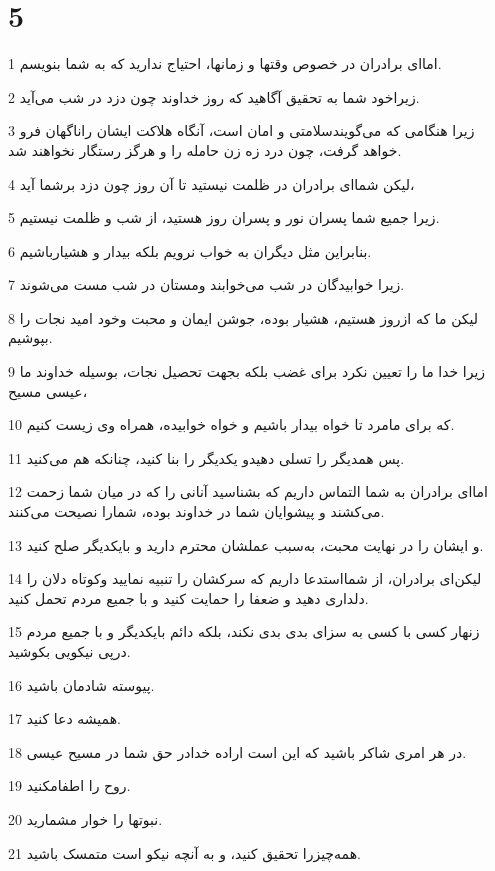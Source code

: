 \chapter{5}

\par 1 اما‌ای برادران در خصوص وقتها و زمانها، احتیاج ندارید که به شما بنویسم.
\par 2 زیراخود شما به تحقیق آگاهید که روز خداوند چون دزد در شب می‌آید.
\par 3 زیرا هنگامی که می‌گویندسلامتی و امان است، آنگاه هلاکت ایشان راناگهان فرو خواهد گرفت، چون درد زه زن حامله را و هرگز رستگار نخواهند شد.
\par 4 لیکن شما‌ای برادران در ظلمت نیستید تا آن روز چون دزد برشما آید،
\par 5 زیرا جمیع شما پسران نور و پسران روز هستید، از شب و ظلمت نیستیم.
\par 6 بنابراین مثل دیگران به خواب نرویم بلکه بیدار و هشیارباشیم.
\par 7 زیرا خوابیدگان در شب می‌خوابند ومستان در شب مست می‌شوند.
\par 8 لیکن ما که ازروز هستیم، هشیار بوده، جوشن ایمان و محبت وخود امید نجات را بپوشیم.
\par 9 زیرا خدا ما را تعیین نکرد برای غضب بلکه بجهت تحصیل نجات، بوسیله خداوند ما عیسی مسیح،
\par 10 که برای مامرد تا خواه بیدار باشیم و خواه خوابیده، همراه وی زیست کنیم.
\par 11 پس همدیگر را تسلی دهیدو یکدیگر را بنا کنید، چنانکه هم می‌کنید.
\par 12 اما‌ای برادران به شما التماس داریم که بشناسید آنانی را که در میان شما زحمت می‌کشند و پیشوایان شما در خداوند بوده، شمارا نصیحت می‌کنند.
\par 13 و ایشان را در نهایت محبت، به‌سبب عملشان محترم دارید و بایکدیگر صلح کنید.
\par 14 لیکن‌ای برادران، از شمااستدعا داریم که سرکشان را تنبیه نمایید وکوتاه دلان را دلداری دهید و ضعفا را حمایت کنید و با جمیع مردم تحمل کنید.
\par 15 زنهار کسی با کسی به سزای بدی بدی نکند، بلکه دائم بایکدیگر و با جمیع مردم در‌پی نیکویی بکوشید.
\par 16 پیوسته شادمان باشید.
\par 17 همیشه دعا کنید.
\par 18 در هر امری شاکر باشید که این است اراده خدادر حق شما در مسیح عیسی.
\par 19 روح را اطفامکنید.
\par 20 نبوتها را خوار مشمارید.
\par 21 همه‌چیزرا تحقیق کنید، و به آنچه نیکو است متمسک باشید.
